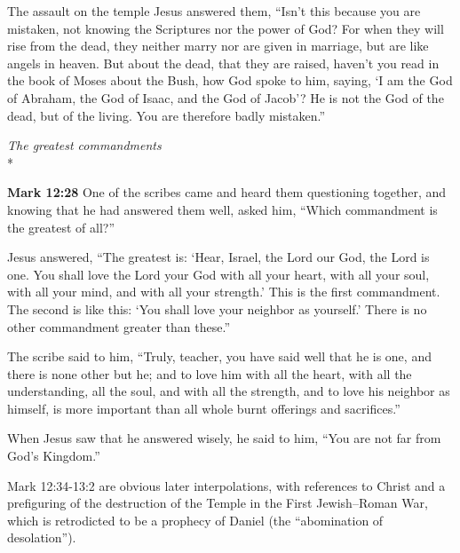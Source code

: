\documentclass[10pt,twoside]{article} %
\newcommand{\quotesize}{\normalsize{}}
\newcommand{\comm}[1]{\begingroup \color{black!50} #1\endgroup}
\newenvironment{quotetext}{\begingroup\quotesize}{\endgroup}
\newcommand{\intex}[1]{\index[texts]{#1}}
\newcommand{\bible}[2]{\begin{quotetext}\textbf{#1}\intex{#1} #2\end{quotetext}}
\newcommand{\gospelmark}[2]{\bible{Mark #1}{#2}}
\newcommand{\subhead}[1]{\emph{#1}\\*}
\begin{document}
\begin{section}{The assault on the temple}
{  Jesus answered them, ``Isn't this because you are mistaken, not knowing the Scriptures nor the power of God?    For when they will rise from the dead, they neither marry nor are given in marriage, but are like angels in heaven.    But about the dead, that they are raised, haven't you read in the book of Moses about the Bush, how God spoke to him, saying, `I am the God of Abraham, the God of Isaac, and the God of Jacob'?    He is not the God of the dead, but of the living. You are therefore badly mistaken.'' 
}

\subhead{The greatest commandments}\label{greatest-commandments}

\gospelmark{12:28}{
One of the scribes came and heard them questioning together, and knowing that he had answered them well, asked him, ``Which commandment is the greatest of all?''

  Jesus answered, ``The greatest is: `Hear, Israel, the Lord our God, the Lord is one.    You shall love the Lord your God with all your heart, with all your soul, with all your mind, and with all your strength.' This is the first commandment.    The second is like this: `You shall love your neighbor as yourself.' There is no other commandment greater than these.''

  The scribe said to him, ``Truly, teacher, you have said well that he is one, and there is none other but he;   and to love him with all the heart, with all the understanding, all the soul, and with all the strength, and to love his neighbor as himself, is more important than all whole burnt offerings and sacrifices.''

  When Jesus saw that he answered wisely, he said to him, ``You are not far from God's Kingdom.'' 
}

\comm{Mark 12:34-13:2 are obvious later interpolations, with references to Christ and a prefiguring of the destruction of the
Temple in the First Jewish–Roman War, which is retrodicted to be a prophecy of 
Daniel (the ``abomination of desolation'').}

\end{section}
\end{document}
